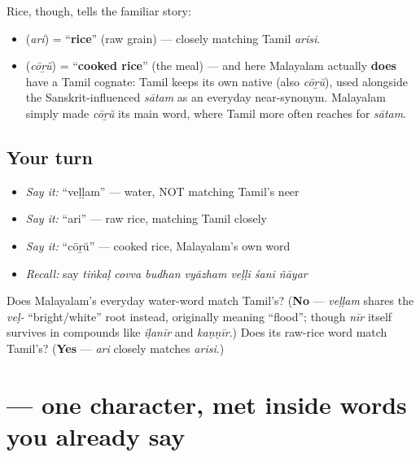 \begin{cousinweb}
Rice, though, tells the familiar story:

\begin{itemize}
\raggedright
  \item \textbf{} (\emph{ari}) = \textquotedblleft{}\textbf{rice}\textquotedblright{} (raw grain) — closely matching Tamil \emph{arisi}.
  \item \textbf{} (\emph{cōṟŭ}) = \textquotedblleft{}\textbf{cooked rice}\textquotedblright{} (the meal) — and here Malayalam actually \textbf{does} have a Tamil cognate: Tamil keeps its own native \textbf{} (also \emph{cōṟŭ}), used alongside the Sanskrit-influenced \emph{sātam} as an everyday near-synonym. Malayalam simply made \emph{cōṟŭ} its main word, where Tamil more often reaches for \emph{sātam}.
\end{itemize}
\end{cousinweb}

\subsection*{Your turn}
\begin{itemize}
\raggedright
  \item \emph{Say it:} \textquotedblleft{}veḷḷam\textquotedblright{} — water, NOT matching Tamil's neer
  \item \emph{Say it:} \textquotedblleft{}ari\textquotedblright{} — raw rice, matching Tamil closely
  \item \emph{Say it:} \textquotedblleft{}cōṟŭ\textquotedblright{} — cooked rice, Malayalam's own word
  \item \emph{Recall:} say \emph{tiṅkaḷ covva budhan vyāzham veḷḷi śani ñāyar}
\end{itemize}

\begin{tcolorbox}[breakable,colback=teal!4,colframe=teal!35!black,title={Before you move on}]
Does Malayalam's everyday water-word match Tamil's? (\textbf{No} — \emph{veḷḷam} shares the \emph{veḷ-} \textquotedblleft{}bright/white\textquotedblright{} root instead, originally meaning \textquotedblleft{}flood\textquotedblright{}; though \emph{nīr} itself survives in compounds like \emph{iḷanīr} and \emph{kaṇṇīr}.) Does its raw-rice word match Tamil's? (\textbf{Yes} — \emph{ari} closely matches \emph{arisi}.)
\end{tcolorbox}
\section[\texorpdfstring{\ml{ോ} (ō)}{ോ (ō)}]{ — one character, met inside words you already say}

